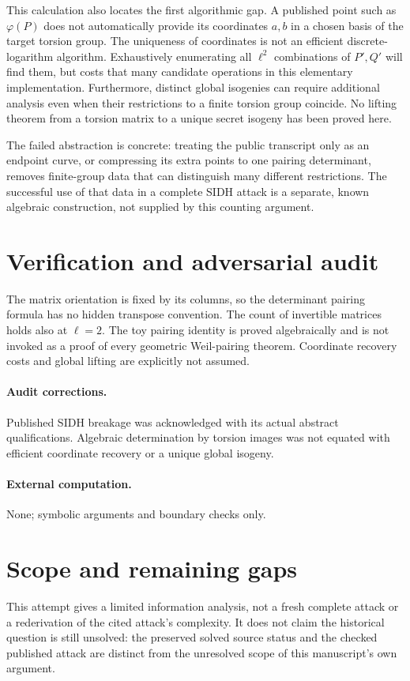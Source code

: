 \documentclass[11pt]{article}
\begin{document}
This calculation also locates the first algorithmic gap. A published point such as $\varphi(P)$ does not automatically provide its coordinates $a,b$ in a chosen basis of the target torsion group. The uniqueness of coordinates is not an efficient discrete-logarithm algorithm. Exhaustively enumerating all $\ell^2$ combinations of $P',Q'$ will find them, but costs that many candidate operations in this elementary implementation. Furthermore, distinct global isogenies can require additional analysis even when their restrictions to a finite torsion group coincide. No lifting theorem from a torsion matrix to a unique secret isogeny has been proved here.

The failed abstraction is concrete: treating the public transcript only as an endpoint curve, or compressing its extra points to one pairing determinant, removes finite-group data that can distinguish many different restrictions. The successful use of that data in a complete SIDH attack is a separate, known algebraic construction, not supplied by this counting argument.
\section{Verification and adversarial audit}
The matrix orientation is fixed by its columns, so the determinant pairing formula has no hidden transpose convention. The count of invertible matrices holds also at $\ell=2$. The toy pairing identity is proved algebraically and is not invoked as a proof of every geometric Weil-pairing theorem. Coordinate recovery costs and global lifting are explicitly not assumed.
\paragraph{Audit corrections.} Published SIDH breakage was acknowledged with its actual abstract qualifications. Algebraic determination by torsion images was not equated with efficient coordinate recovery or a unique global isogeny.
\paragraph{External computation.} None; symbolic arguments and boundary checks only.
\section{Scope and remaining gaps}
This attempt gives a limited information analysis, not a fresh complete attack or a rederivation of the cited attack's complexity. It does not claim the historical question is still unsolved: the preserved solved source status and the checked published attack are distinct from the unresolved scope of this manuscript's own argument.
\end{document}
